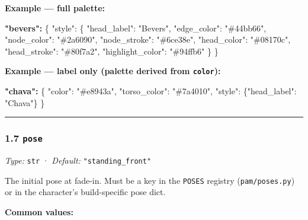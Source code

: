 \documentclass[
  11pt,
]{book}
\newenvironment{Shaded}{}{}
\newcommand{\DataTypeTok}[1]{\textcolor[rgb]{0.56,0.13,0.00}{#1}}
\newcommand{\ErrorTok}[1]{\textcolor[rgb]{1.00,0.00,0.00}{\textbf{#1}}}
\newcommand{\FunctionTok}[1]{\textcolor[rgb]{0.02,0.16,0.49}{#1}}
\newcommand{\StringTok}[1]{\textcolor[rgb]{0.25,0.44,0.63}{#1}}
\begin{document}
\textbf{Example --- full palette:}

\begin{Shaded}
\begin{Highlighting}[]
\ErrorTok{"bevers":} \FunctionTok{\{}
  \DataTypeTok{"style"}\FunctionTok{:} \FunctionTok{\{}
    \DataTypeTok{"head\_label"}\FunctionTok{:} \StringTok{"Bevers"}\FunctionTok{,}
    \DataTypeTok{"edge\_color"}\FunctionTok{:} \StringTok{"\#44bb66"}\FunctionTok{,}
    \DataTypeTok{"node\_color"}\FunctionTok{:} \StringTok{"\#2a6090"}\FunctionTok{,}
    \DataTypeTok{"node\_stroke"}\FunctionTok{:} \StringTok{"\#6ce38e"}\FunctionTok{,}
    \DataTypeTok{"head\_color"}\FunctionTok{:} \StringTok{"\#08170c"}\FunctionTok{,}
    \DataTypeTok{"head\_stroke"}\FunctionTok{:} \StringTok{"\#80f7a2"}\FunctionTok{,}
    \DataTypeTok{"highlight\_color"}\FunctionTok{:} \StringTok{"\#94ffb6"}
  \FunctionTok{\}}
\FunctionTok{\}}
\end{Highlighting}
\end{Shaded}

\textbf{Example --- label only (palette derived from \texttt{color}):}

\begin{Shaded}
\begin{Highlighting}[]
\ErrorTok{"chava":} \FunctionTok{\{}
  \DataTypeTok{"color"}\FunctionTok{:} \StringTok{"\#e8943a"}\FunctionTok{,}
  \DataTypeTok{"torso\_color"}\FunctionTok{:} \StringTok{"\#7a4010"}\FunctionTok{,}
  \DataTypeTok{"style"}\FunctionTok{:} \FunctionTok{\{}\DataTypeTok{"head\_label"}\FunctionTok{:} \StringTok{"Chava"}\FunctionTok{\}}
\FunctionTok{\}}
\end{Highlighting}
\end{Shaded}

\begin{center}\rule{0.5\linewidth}{0.5pt}\end{center}

\subsubsection{\texorpdfstring{1.7 \texttt{pose}}{1.7 pose}}\label{pose}

\emph{Type:} \texttt{str} · \emph{Default:} \texttt{"standing\_front"}

The initial pose at fade-in. Must be a key in the \texttt{POSES}
registry (\texttt{pam/poses.py}) or in the character's build-specific
pose dict.

\textbf{Common values:}
\end{document}
